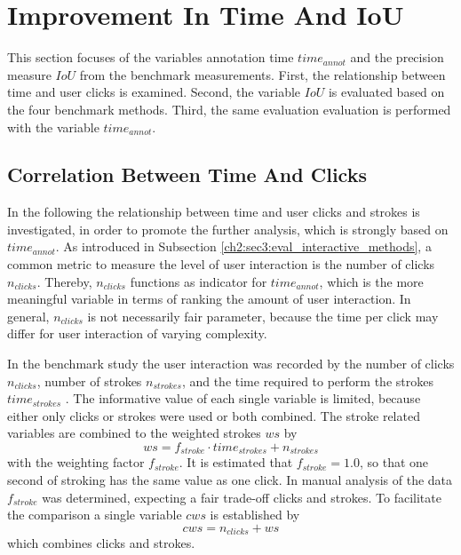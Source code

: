 
\section{Improvement In Time And IoU}\label{ord:ch5:sec1}

This section focuses of the variables annotation time $time_{annot}$ and the precision measure $IoU$ from the benchmark measurements.
First, the relationship between time and user clicks is examined.
Second, the variable $IoU$ is evaluated based on the four benchmark methods.
Third, the same evaluation evaluation is performed with the variable $time_{annot}$. 


\subsection{Correlation Between Time And Clicks}\label{ord:ch5:sec1:subsec1}

In the following the relationship between time and user clicks and strokes is investigated, in order to promote the further analysis, which is strongly based on $time_{annot}$. 
As introduced in Subsection \ref{ch2:sec3:eval_interactive_methods}, a common metric to measure the level of user interaction is the number of clicks $n_{clicks}$.
Thereby, $n_{clicks}$ functions as indicator for $time_{annot}$, which is the more meaningful variable in terms of ranking the amount of user interaction.
In general, $n_{clicks}$ is not necessarily fair parameter, because the time per click may differ for user interaction of varying complexity.

In the benchmark study the user interaction was recorded by the number of clicks $n_{clicks}$, number of strokes $n_{strokes}$, and the time required to perform the strokes $time_{strokes}$ .
The informative value of each single variable is limited, because either only clicks or strokes were used or both combined.
The stroke related variables are combined to the weighted strokes $ ws $ by
\begin{equation} \label{equ:ws}
	ws = f_{stroke} \cdot time_{strokes} + n_{strokes} 
\end{equation}
with the weighting factor $ f_{stroke} $.
It is estimated that $ f_{stroke}=1.0 $, so that one second of stroking has the same value as one click.
In manual analysis of the data $ f_{stroke} $ was determined, expecting a fair trade-off clicks and strokes.
To facilitate the comparison a single variable $ cws $ is established by 
\begin{equation}
	cws = n_{clicks} + ws
\end{equation}
which combines clicks and strokes.

